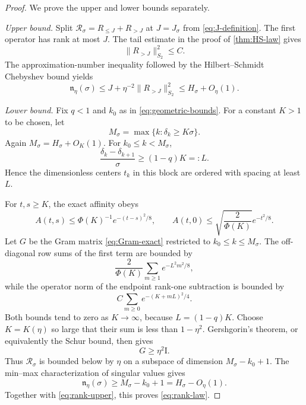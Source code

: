 \documentclass[11pt]{article}
\theoremstyle{definition}
\theoremstyle{remark}
\newcommand{\cR}{\mathcal R}
\newcommand{\Id}{\mathrm I}
\newcommand{\ranketa}{\mathfrak n_\eta}
\begin{document}
\begin{proof}
We prove the upper and lower bounds separately.

\emph{Upper bound.}
Split $\cR_\sigma=R_{\le J}+R_{>J}$ at $J=J_\sigma$ from
\eqref{eq:J-definition}.  The first operator has rank at most $J$.  The tail
estimate in the proof of \cref{thm:HS-law} gives
\begin{equation}\label{eq:tail-HS}
 \|R_{>J}\|_{S_2}^2\le C.
\end{equation}
The approximation-number inequality followed by the Hilbert--Schmidt
Chebyshev bound yields
\begin{equation}\label{eq:rank-upper}
 \ranketa(\sigma)
 \le J+\eta^{-2}\|R_{>J}\|_{S_2}^2
 \le H_\sigma+O_\eta(1).
\end{equation}

\emph{Lower bound.}
Fix $q<1$ and $k_0$ as in \eqref{eq:geometric-bounds}.  For a constant $K>1$
to be chosen, let
\begin{equation}\label{eq:M-definition}
 M_\sigma=\max\{k:\delta_k\ge K\sigma\}.
\end{equation}
Again $M_\sigma=H_\sigma+O_K(1)$.  For
$k_0\le k<M_\sigma$,
\begin{equation}\label{eq:resolved-spacing}
 \frac{\delta_k-\delta_{k+1}}\sigma
 \ge(1-q)K=:L.
\end{equation}
Hence the dimensionless centers $t_k$ in this block are ordered with spacing
at least $L$.

For $t,s\ge K$, the exact affinity obeys
\begin{equation}\label{eq:affinity-majorants}
 A(t,s)\le\Phi(K)^{-1}e^{-(t-s)^2/8},
 \qquad
 A(t,0)\le
 \sqrt{\frac2{\Phi(K)}}e^{-t^2/8}.
\end{equation}
Let $G$ be the Gram matrix \eqref{eq:Gram-exact} restricted to
$k_0\le k\le M_\sigma$.  The off-diagonal row sums of the first term are
bounded by
\begin{equation}\label{eq:off-diagonal-bound}
 \frac2{\Phi(K)}\sum_{m\ge1}e^{-L^2m^2/8},
\end{equation}
while the operator norm of the endpoint rank-one subtraction is bounded by
\begin{equation}\label{eq:endpoint-vector-bound}
 C\sum_{m\ge0}e^{-(K+mL)^2/4}.
\end{equation}
Both bounds tend to zero as $K\to\infty$, because $L=(1-q)K$.
Choose $K=K(\eta)$ so large that their sum is less than $1-\eta^2$.
Gershgorin's theorem, or equivalently the Schur bound, then gives
\begin{equation}\label{eq:riesz-lower}
 G\ge\eta^2\Id.
\end{equation}
Thus $\cR_\sigma$ is bounded below by $\eta$ on a subspace of dimension
$M_\sigma-k_0+1$.  The min--max characterization of singular values gives
\begin{equation}\label{eq:rank-lower}
 \ranketa(\sigma)
 \ge M_\sigma-k_0+1
 =H_\sigma-O_\eta(1).
\end{equation}
Together with \eqref{eq:rank-upper}, this proves \eqref{eq:rank-law}.
\end{proof}
\end{document}
